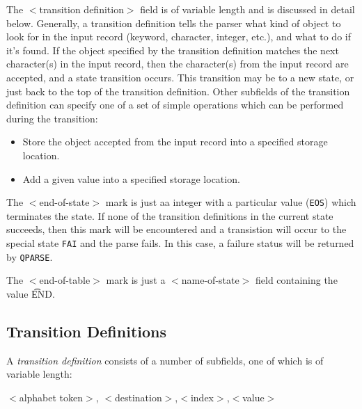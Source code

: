 The $<$transition definition$>$ field is of variable length and is
discussed in detail below. Generally, a transition definition tells the
parser what kind of object to look for in the input record (keyword,
character, integer, etc.), and what to do if it's found. If the object
specified by the transition definition matches the next character(s) in
the input record, then the character(s) from the input record are accepted,
and a state transition occurs. This transition may be to a new state,
or just back to the top of the transition definition. Other subfields
of the transition definition can specify one of a set of simple
operations which can be performed during the transition:
\begin{itemize}
\item Store the object accepted from the input record into a
specified storage location.
\item Add a given value into a specified storage location.
\end{itemize}
The $<$end-of-state$>$ mark is just aa integer with a particular value
({\tt EOS}) which terminates the state. If none of the transition
definitions in the current state succeeds, then this mark will be
encountered and a transistion will occur to the special state {\tt FAI} and
the parse fails. In this case, a failure status will be returned by
{\tt QPARSE}.

The $<$end-of-table$>$ mark is just a $<$name-of-state$>$ field containing
the value {\t END}.
\subsection{Transition Definitions}
A {\em transition definition} consists of a number of subfields, one of
which is of variable length:

$<$alphabet token$>$, $<$destination$>$,$<$index$>$,$<$value$>$

